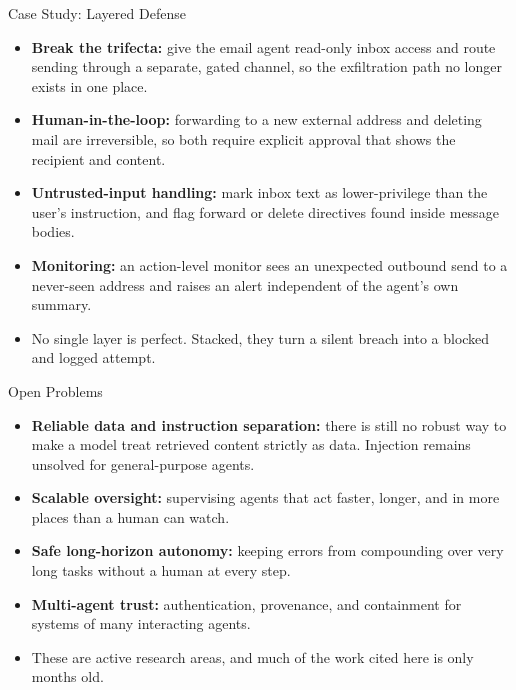 \begin{frame}{Case Study: Layered Defense}
  \begin{itemize}\itemsep0.45em
    \item[\textcolor{KAred}{$\blacktriangleright$}] \textbf{Break the trifecta:} give the email agent read-only inbox access and route sending through a separate, gated channel, so the exfiltration path no longer exists in one place.
    \item[\textcolor{KAred}{$\blacktriangleright$}] \textbf{Human-in-the-loop:} forwarding to a new external address and deleting mail are irreversible, so both require explicit approval that shows the recipient and content.
    \item[\textcolor{KAred}{$\blacktriangleright$}] \textbf{Untrusted-input handling:} mark inbox text as lower-privilege than the user's instruction, and flag forward or delete directives found inside message bodies.
    \item[\textcolor{KAred}{$\blacktriangleright$}] \textbf{Monitoring:} an action-level monitor sees an unexpected outbound send to a never-seen address and raises an alert independent of the agent's own summary.
    \item[\textcolor{KAred}{$\blacktriangleright$}] No single layer is perfect. Stacked, they turn a silent breach into a blocked and logged attempt.
  \end{itemize}
\end{frame}

\begin{frame}{Open Problems}
  \begin{itemize}\itemsep0.5em
    \item[\textcolor{KAred}{$\blacktriangleright$}] \textbf{Reliable data and instruction separation:} there is still no robust way to make a model treat retrieved content strictly as data. Injection remains unsolved for general-purpose agents.
    \item[\textcolor{KAred}{$\blacktriangleright$}] \textbf{Scalable oversight:} supervising agents that act faster, longer, and in more places than a human can watch.
    \item[\textcolor{KAred}{$\blacktriangleright$}] \textbf{Safe long-horizon autonomy:} keeping errors from compounding over very long tasks without a human at every step.
    \item[\textcolor{KAred}{$\blacktriangleright$}] \textbf{Multi-agent trust:} authentication, provenance, and containment for systems of many interacting agents.
    \item[\textcolor{KAred}{$\blacktriangleright$}] These are active research areas, and much of the work cited here is only months old.
  \end{itemize}
\end{frame}
